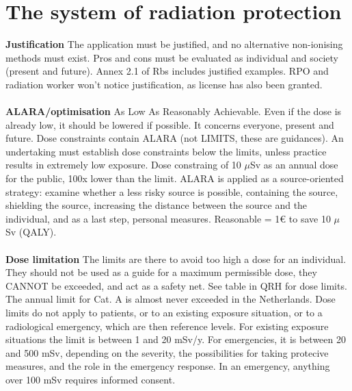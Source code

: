 \section{The system of radiation protection}
\textbf{Justification} The application must be justified, and no alternative non-ionising methods must exist. Pros and cons must be evaluated as individual and society (present and future). Annex 2.1 of Rbs includes justified examples. RPO and radiation worker won't notice justification, as license has also been granted.\\\\
\textbf{ALARA/optimisation}  As Low As Reasonably Achievable. Even if the dose is already low, it should be lowered if possible. It concerns everyone, present and future. Dose constraints contain ALARA (not LIMITS, these are guidances). An undertaking must establish dose constraints below the limits, unless practice results in extremely low exposure. Dose constraing of 10 $\mu$Sv as an annual dose for the public, 100x lower than the limit. ALARA is applied as a source-oriented strategy: examine whether a less risky source is possible, containing the source, shielding the source, increasing the distance between the source and the individual, and as a last step, personal measures. Reasonable = 1€ to save 10 $\mu$Sv (QALY). \\\\
\textbf{Dose limitation}  The limits are there to avoid too high a dose for an individual. They should not be used as a guide for a maximum permissible dose, they CANNOT be exceeded, and act as a safety net. See table in QRH for dose limits. The annual limit for Cat. A is almost never exceeded in the Netherlands. Dose limits do not apply to patients, or to an existing exposure situation, or to a radiological emergency, which are then reference levels. For existing exposure situations the limit is between 1 and 20 mSv/y. For emergencies, it is between 20 and 500 mSv, depending on the severity, the possibilities for taking protecive measures, and the role in the emergency response. In an emergency, anything over 100 mSv requires informed consent.\\\\
